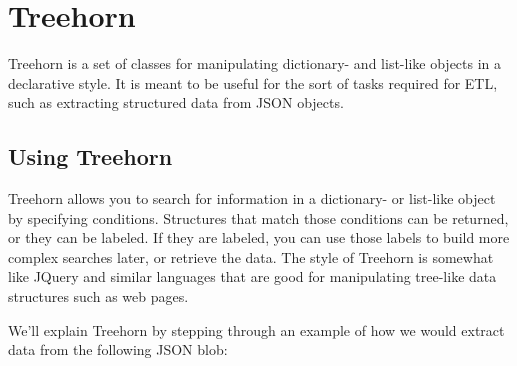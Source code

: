 \documentclass[letterpaper,10pt,english]{sphinxmanual}
\begin{document}
\chapter{Treehorn}
\label{\detokenize{treehorn:treehorn}}\label{\detokenize{treehorn::doc}}
Treehorn is a set of classes for manipulating dictionary- and list-like objects in a declarative style. It is meant to be useful for the sort of tasks required for ETL, such as extracting structured data from JSON objects.


\section{Using Treehorn}
\label{\detokenize{treehorn:using-treehorn}}
Treehorn allows you to search for information in a dictionary- or list-like object by specifying conditions. Structures that match those conditions can be returned, or they can be labeled. If they are labeled, you can use those labels to build more complex searches later, or retrieve the data. The style of Treehorn is somewhat like JQuery and similar languages that are good for manipulating tree-like data structures such as web pages.

We’ll explain Treehorn by stepping through an example of how we would extract data from the following JSON blob:
\end{document}
